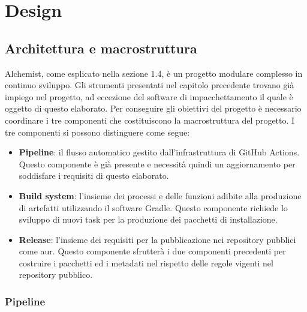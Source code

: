 \chapter{Design}

\section{Architettura e macrostruttura}

Alchemist, come esplicato nella sezione 1.4, è un progetto modulare complesso in continuo sviluppo. Gli strumenti presentati nel capitolo precedente trovano già impiego nel progetto, ad eccezione del software di impacchettamento il quale è oggetto di questo elaborato. Per conseguire gli obiettivi del progetto è necessario coordinare i tre componenti che costituiscono la macrostruttura del progetto. I tre componenti si possono distinguere come segue:
\begin{itemize}
	\item \textbf{Pipeline}: il flusso automatico gestito dall'infrastruttura di GitHub Actions. Questo componente è già presente e necessità quindi un aggiornamento per soddisfare i requisiti di questo elaborato.
	\item \textbf{Build system}: l'insieme dei processi e delle funzioni adibite alla produzione di artefatti utilizzando il software Gradle. Questo componente richiede lo sviluppo di nuovi task per la produzione dei pacchetti di installazione.
	\item \textbf{Release}: l'insieme dei requisiti per la pubblicazione nei repository pubblici come \ac{aur}. Questo componente sfrutterà i due componenti precedenti per costruire i pacchetti ed i metadati nel rispetto delle regole vigenti nel repository pubblico.
\end{itemize}

\subsection{Pipeline}

